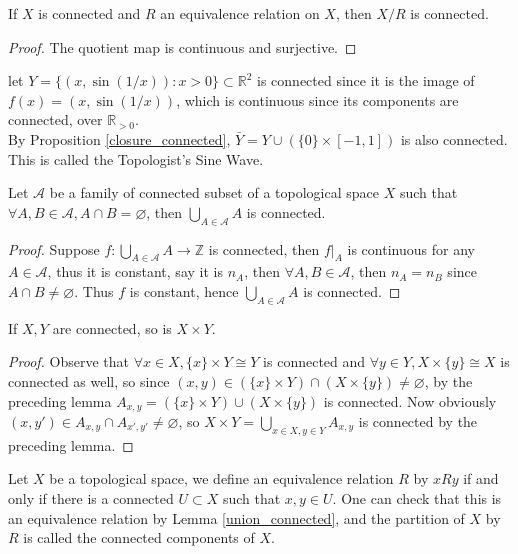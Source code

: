 \begin{corollary}
    If $X$ is connected and $R$ an equivalence relation on $X$, then $X/R$ is connected.
\end{corollary}
\begin{proof}
    The quotient map is continuous and surjective.
\end{proof}
\begin{example}
    let $Y=\{(x,\sin(1/x)):x>0\}\subset\mathbb R^2$ is connected since it is the image of $f(x)=(x,\sin(1/x))$, which is continuous since its components are connected, over $\mathbb R_{>0}$.\\
    By Proposition \ref{closure_connected}, $\bar Y=Y\cup(\{0\}\times [-1,1])$ is also connected.
    This is called the Topologist's Sine Wave.
\end{example}
\begin{lemma}\label{union_connected}
    Let $\mathscr A$ be a family of connected subset of a topological space $X$ such that $\forall A,B\in\mathscr A,A\cap B=\varnothing$, then $\bigcup_{A\in\mathscr A}A$ is connected.
\end{lemma}
\begin{proof}
    Suppose $f:\bigcup_{A\in\mathscr A}A\to\mathbb Z$ is connected, then $f|_A$ is continuous for any $A\in\mathscr A$, thus it is constant, say it is $n_A$, then $\forall A,B\in\mathscr A$, then $n_A=n_B$ since $A\cap B\neq\varnothing$.
    Thus $f$ is constant, hence $\bigcup_{A\in\mathscr A}A$ is connected.
\end{proof}
\begin{proposition}
    If $X,Y$ are connected, so is $X\times Y$.
\end{proposition}
\begin{proof}
    Observe that $\forall x\in X,\{x\}\times Y\cong Y$ is connected and $\forall y\in Y, X\times \{y\}\cong X$ is connected as well, so since $(x,y)\in (\{x\}\times Y)\cap(X\times \{y\})\neq\varnothing$, by the preceding lemma $A_{x,y}=(\{x\}\times Y)\cup(X\times \{y\})$ is connected.
    Now obviously $(x,y')\in A_{x,y}\cap A_{x',y'}\neq\varnothing$, so $X\times Y=\bigcup_{x\in X,y\in Y}A_{x,y}$ is connected by the preceding lemma.
\end{proof}
\begin{definition}
    Let $X$ be a topological space, we define an equivalence relation $R$ by $xRy$ if and only if there is a connected $U\subset X$ such that $x,y\in U$.
    One can check that this is an equivalence relation by Lemma \ref{union_connected}, and the partition of $X$ by $R$ is called the connected components of $X$.
\end{definition}
